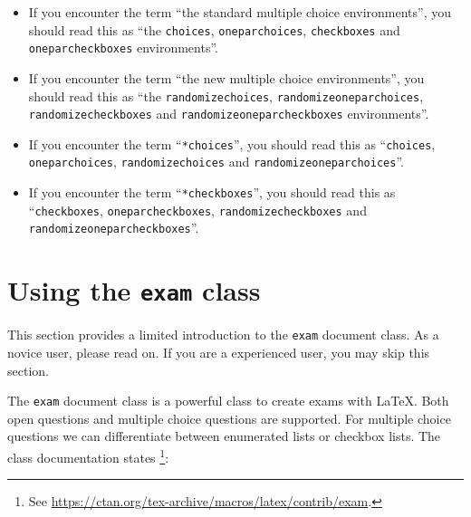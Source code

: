 \documentclass[12pt,a4paper]{exam}
\begin{document}
\begin{itemize}
\item If you encounter the term ``the standard multiple choice environments'',
you should read this as ``the \texttt{choices}, \texttt{oneparchoices},
\texttt{checkboxes} and \texttt{oneparcheckboxes} environments''.

\item If you encounter the term ``the new multiple choice environments'',
you should read this as ``the \texttt{randomizechoices}, \texttt{randomizeoneparchoices},
\texttt{randomizecheckboxes} and \texttt{randomizeoneparcheckboxes} environments''.

\item If you encounter the term ``\texttt{*choices}'', you should read this as
``\texttt{choices}, \texttt{oneparchoices}, \texttt{randomizechoices} and \texttt{randomizeoneparchoices}''.

\item If you encounter the term ``\texttt{*checkboxes}'', you should read this as
``\texttt{checkboxes}, \texttt{oneparcheckboxes}, \texttt{randomizecheckboxes} and \texttt{randomizeoneparcheckboxes}''.

\end{itemize}


\section{Using the \texttt{exam} class}
This section provides a limited introduction to the \texttt{exam} document
class. As a novice user, please read on. If you are a experienced user,
you may skip this section.

The \verb|exam| document class is a powerful class to create exams
with \LaTeX{}. Both open questions and multiple choice questions are
supported. For multiple choice questions we can differentiate between
enumerated lists or checkbox lists. The class documentation states%
\footnote{See \url{https://ctan.org/tex-archive/macros/latex/contrib/exam}.}:
\end{document}
